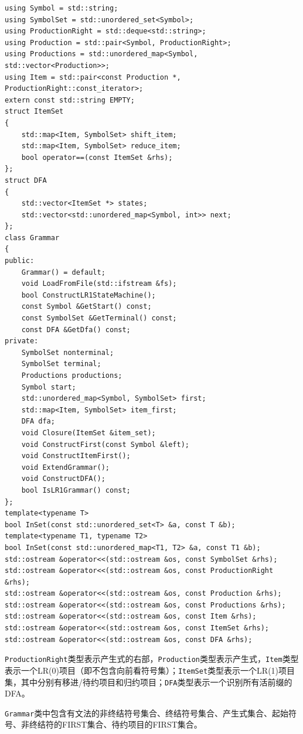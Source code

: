 \documentclass[lang=cn,11pt,a4paper,cite=authornum]{paper}
\begin{document}
\begin{code}
    \begin{verbatim}
using Symbol = std::string;
using SymbolSet = std::unordered_set<Symbol>;
using ProductionRight = std::deque<std::string>;
using Production = std::pair<Symbol, ProductionRight>;
using Productions = std::unordered_map<Symbol, std::vector<Production>>;
using Item = std::pair<const Production *, ProductionRight::const_iterator>;
extern const std::string EMPTY;
struct ItemSet
{
    std::map<Item, SymbolSet> shift_item;
    std::map<Item, SymbolSet> reduce_item;
    bool operator==(const ItemSet &rhs);
};
struct DFA
{
    std::vector<ItemSet *> states;
    std::vector<std::unordered_map<Symbol, int>> next;
};
class Grammar
{
public:
    Grammar() = default;
    void LoadFromFile(std::ifstream &fs);
    bool ConstructLR1StateMachine();
    const Symbol &GetStart() const;
    const SymbolSet &GetTerminal() const;
    const DFA &GetDfa() const;
private:
    SymbolSet nonterminal;
    SymbolSet terminal;
    Productions productions;
    Symbol start;
    std::unordered_map<Symbol, SymbolSet> first;
    std::map<Item, SymbolSet> item_first;
    DFA dfa;
    void Closure(ItemSet &item_set);
    void ConstructFirst(const Symbol &left);
    void ConstructItemFirst();
    void ExtendGrammar();
    void ConstructDFA();
    bool IsLR1Grammar() const;
};
template<typename T>
bool InSet(const std::unordered_set<T> &a, const T &b);
template<typename T1, typename T2>
bool InSet(const std::unordered_map<T1, T2> &a, const T1 &b);
std::ostream &operator<<(std::ostream &os, const SymbolSet &rhs);
std::ostream &operator<<(std::ostream &os, const ProductionRight &rhs);
std::ostream &operator<<(std::ostream &os, const Production &rhs);
std::ostream &operator<<(std::ostream &os, const Productions &rhs);
std::ostream &operator<<(std::ostream &os, const Item &rhs);
std::ostream &operator<<(std::ostream &os, const ItemSet &rhs);
std::ostream &operator<<(std::ostream &os, const DFA &rhs);
\end{verbatim}
\end{code}

\texttt{ProductionRight}类型表示产生式的右部，\texttt{Production}类型表示产生式，\texttt{Item}类型表示一个LR(0)项目（即不包含向前看符号集）；\texttt{ItemSet}类型表示一个LR(1)项目集，其中分别有移进/待约项目和归约项目；\texttt{DFA}类型表示一个识别所有活前缀的DFA。

\texttt{Grammar}类中包含有文法的非终结符号集合、终结符号集合、产生式集合、起始符号、非终结符的FIRST集合、待约项目的FIRST集合。
\end{document}
